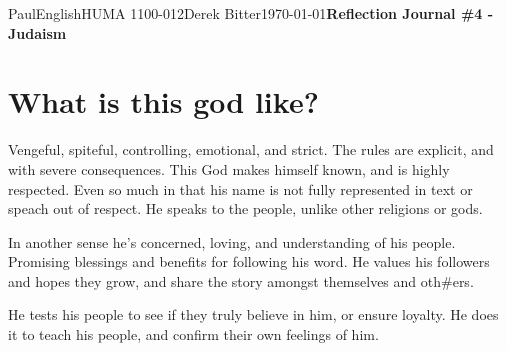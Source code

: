 \documentclass[12pt,letterpaper]{article}
\begin{document}
\begin{mla}{Paul}{English}{HUMA 1100-012}{Derek Bitter}{\today}{\textbf{Reflection Journal \#4 - Judaism}}

\section{What is this god like?}







Vengeful, spiteful, controlling, emotional, and strict. The rules are
explicit, and with severe consequences. This God makes himself known,
and is highly respected. Even so much in that his name is not fully
represented in text or speach out of respect. He speaks to the people,
unlike other religions or gods.

In another sense he's concerned, loving, and understanding of his
people. Promising blessings and benefits for following his word. He
values his followers and hopes they grow, and share the story amongst
themselves and oth#ers.

He tests his people to see if they truly believe in him, or ensure
loyalty. He does it to teach his people, and confirm their own
feelings of him.








\end{mla}
\end{document}
